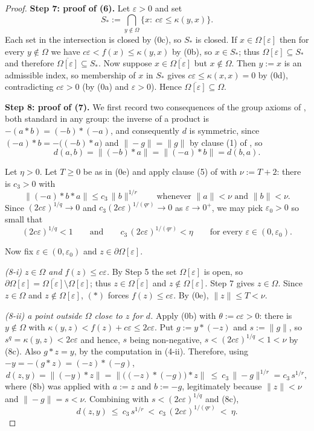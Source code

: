 \begin{proof}
\medskip\noindent\textbf{Step 7: proof of (6).} Let $\varepsilon>0$ and set
\[
 S_\ast:=\bigcap_{y\notin\Omega}\{x:\ c\varepsilon\le\kappa(y,x)\}.
\]
Each set in the intersection is closed by (0c), so $S_\ast$ is closed. If
$x\in\Omega[\varepsilon]$ then for every $y\notin\Omega$ we have
$c\varepsilon<f(x)\le\kappa(y,x)$ by (0b), so $x\in S_\ast$; thus
$\Omega[\varepsilon]\subseteq S_\ast$ and therefore
$\overline{\Omega[\varepsilon]}\subseteq S_\ast$. Now suppose
$x\in\overline{\Omega[\varepsilon]}$ but $x\notin\Omega$. Then $y:=x$ is an admissible index,
so membership of $x$ in $S_\ast$ gives $c\varepsilon\le\kappa(x,x)=0$ by (0d), contradicting
$c\varepsilon>0$ (by (0a) and $\varepsilon>0$). Hence
$\overline{\Omega[\varepsilon]}\subseteq\Omega$.

\medskip\noindent\textbf{Step 8: proof of (7).} We first record two consequences of the
group axioms of , both standard in any group: the inverse of a product
is $-(a*b)=(-b)*(-a)$, and consequently $d$ is symmetric, since
$(-a)*b=-\big((-b)*a\big)$ and $\|-g\|=\|g\|$ by clause (1) of , so
\[
 d(a,b)=\|(-b)*a\|=\|(-a)*b\|=d(b,a). \tag{8a}
\]

Let $\eta>0$. Let $T\ge0$ be as in (0e) and apply clause (5) of  with
$\nu:=T+2$: there is $c_3>0$ with
\[
 \big\|(-a)*b*a\big\|\le c_3\,\|b\|^{1/r}\qquad\text{whenever }\|a\|<\nu\text{ and }\|b\|<\nu. \tag{8b}
\]
Since $(2c\varepsilon)^{1/q}\to0$ and $c_3(2c\varepsilon)^{1/(qr)}\to0$ as
$\varepsilon\to0^{+}$, we may pick $\varepsilon_0>0$ so small that
\[
 (2c\varepsilon)^{1/q}<1
 \qquad\text{and}\qquad
 c_3\,(2c\varepsilon)^{1/(qr)}<\eta
 \qquad\text{for every }\varepsilon\in(0,\varepsilon_0). \tag{8c}
\]

Now fix $\varepsilon\in(0,\varepsilon_0)$ and $z\in\partial\Omega[\varepsilon]$.

\emph{(8-i) $z\in\Omega$ and $f(z)\le c\varepsilon$.} By Step 5 the set
$\Omega[\varepsilon]$ is open, so
$\partial\Omega[\varepsilon]=\overline{\Omega[\varepsilon]}\setminus\Omega[\varepsilon]$;
thus $z\in\overline{\Omega[\varepsilon]}$ and $z\notin\Omega[\varepsilon]$. Step 7 gives
$z\in\Omega$. Since $z\in\Omega$ and $z\notin\Omega[\varepsilon]$, $(\ast)$ forces
$f(z)\le c\varepsilon$. By (0e), $\|z\|\le T<\nu$.

\emph{(8-ii) a point outside $\Omega$ close to $z$ for $d$.} Apply (0b) with
$\theta:=c\varepsilon>0$: there is $y\notin\Omega$ with
$\kappa(y,z)<f(z)+c\varepsilon\le2c\varepsilon$. Put $g:=y*(-z)$ and $s:=\|g\|$, so
$s^{q}=\kappa(y,z)<2c\varepsilon$ and hence, $s$ being non-negative,
$s<(2c\varepsilon)^{1/q}<1<\nu$ by (8c). Also $g*z=y$, by the computation in (4-ii).
Therefore, using $-y=-(g*z)=(-z)*(-g)$,
\[
 d(z,y)=\big\|(-y)*z\big\|=\big\|\big((-z)*(-g)\big)*z\big\|
 \ \le\ c_3\,\|-g\|^{1/r}=c_3\,s^{1/r},
\]
where (8b) was applied with $a:=z$ and $b:=-g$, legitimately because $\|z\|<\nu$ and
$\|-g\|=s<\nu$. Combining with $s<(2c\varepsilon)^{1/q}$ and (8c),
\[
 d(z,y)\ \le\ c_3\,s^{1/r}\ <\ c_3\,(2c\varepsilon)^{1/(qr)}\ <\ \eta . \tag{8d}
\]


\end{proof}
